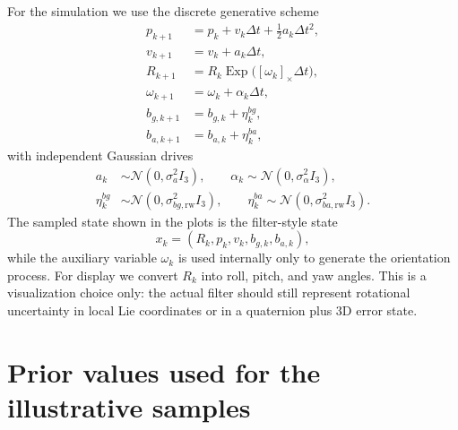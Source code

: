 \documentclass[11pt]{report}
\newcommand{\Exp}{\operatorname{Exp}}
\newcommand{\crossmat}[1]{\left[#1\right]_{\times}}
\begin{document}
For the simulation we use the discrete generative scheme
\begin{align}
p_{k+1} &= p_k + v_k \Delta t + \tfrac12 a_k \Delta t^2,\\
v_{k+1} &= v_k + a_k \Delta t,\\
R_{k+1} &= R_k \Exp\!\big(\crossmat{\omega_k}\Delta t\big),\\
\omega_{k+1} &= \omega_k + \alpha_k \Delta t,\\
b_{g,k+1} &= b_{g,k} + \eta^{bg}_k,\\
b_{a,k+1} &= b_{a,k} + \eta^{ba}_k,
\end{align}
with independent Gaussian drives
\begin{align}
a_k &\sim \mathcal N(0,\sigma_a^2 I_3),\qquad
\alpha_k \sim \mathcal N(0,\sigma_\alpha^2 I_3),\\
\eta^{bg}_k &\sim \mathcal N(0,\sigma_{bg,\mathrm{rw}}^2 I_3),\qquad
\eta^{ba}_k \sim \mathcal N(0,\sigma_{ba,\mathrm{rw}}^2 I_3).
\end{align}
The sampled state shown in the plots is the filter-style state
\[
x_k=(R_k,p_k,v_k,b_{g,k},b_{a,k}),
\]
while the auxiliary variable $\omega_k$ is used internally only to generate the orientation process. For display we convert $R_k$ into roll, pitch, and yaw angles. This is a visualization choice only: the actual filter should still represent rotational uncertainty in local Lie coordinates or in a quaternion plus 3D error state.

\section{Prior values used for the illustrative samples}
\end{document}
